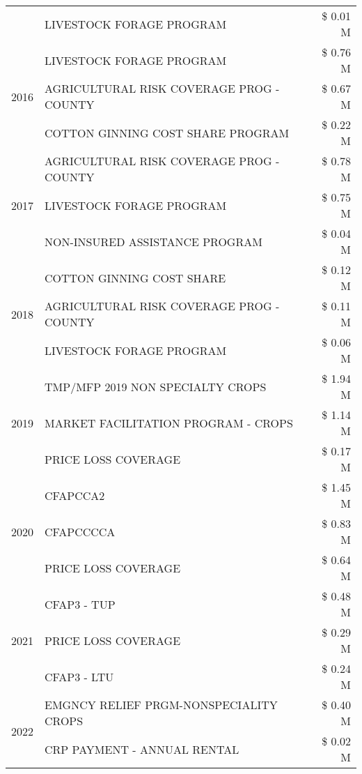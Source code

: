 \begin{tabular}{llr}
 & LIVESTOCK FORAGE PROGRAM & \$ 0.01 M \\
\cline{1-3}
\multirow[t]{3}{*}{2016} & LIVESTOCK FORAGE PROGRAM & \$ 0.76 M \\
 & AGRICULTURAL RISK COVERAGE PROG - COUNTY & \$ 0.67 M \\
 & COTTON GINNING COST SHARE PROGRAM & \$ 0.22 M \\
\cline{1-3}
\multirow[t]{3}{*}{2017} & AGRICULTURAL RISK COVERAGE PROG - COUNTY & \$ 0.78 M \\
 & LIVESTOCK FORAGE PROGRAM & \$ 0.75 M \\
 & NON-INSURED ASSISTANCE PROGRAM & \$ 0.04 M \\
\cline{1-3}
\multirow[t]{3}{*}{2018} & COTTON GINNING COST SHARE & \$ 0.12 M \\
 & AGRICULTURAL RISK COVERAGE PROG - COUNTY & \$ 0.11 M \\
 & LIVESTOCK FORAGE PROGRAM & \$ 0.06 M \\
\cline{1-3}
\multirow[t]{3}{*}{2019} & TMP/MFP 2019 NON SPECIALTY CROPS & \$ 1.94 M \\
 & MARKET FACILITATION PROGRAM - CROPS & \$ 1.14 M \\
 & PRICE LOSS COVERAGE & \$ 0.17 M \\
\cline{1-3}
\multirow[t]{3}{*}{2020} & CFAPCCA2 & \$ 1.45 M \\
 & CFAPCCCCA & \$ 0.83 M \\
 & PRICE LOSS COVERAGE & \$ 0.64 M \\
\cline{1-3}
\multirow[t]{3}{*}{2021} & CFAP3 - TUP & \$ 0.48 M \\
 & PRICE LOSS COVERAGE & \$ 0.29 M \\
 & CFAP3 - LTU & \$ 0.24 M \\
\cline{1-3}
\multirow[t]{2}{*}{2022} & EMGNCY RELIEF PRGM-NONSPECIALITY CROPS & \$ 0.40 M \\
 & CRP PAYMENT - ANNUAL RENTAL & \$ 0.02 M \\
\cline{1-3}
\bottomrule
\end{tabular}
